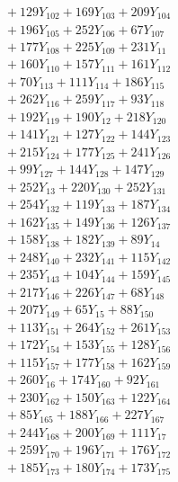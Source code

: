 \documentclass[a4paper,10pt]{article}
\begin{document}
{\begin{align}
&\quad  + 129Y_{102} + 169Y_{103} + 209Y_{104} \\[0.5ex]
&\quad  + 196Y_{105} + 252Y_{106} + 67Y_{107} \\[0.5ex]
&\quad  + 177Y_{108} + 225Y_{109} + 231Y_{11} \\[0.5ex]
&\quad  + 160Y_{110} + 157Y_{111} + 161Y_{112} \\[0.5ex]
&\quad  + 70Y_{113} + 111Y_{114} + 186Y_{115} \\[0.5ex]
&\quad  + 262Y_{116} + 259Y_{117} + 93Y_{118} \\[0.5ex]
&\quad  + 192Y_{119} + 190Y_{12} + 218Y_{120} \\[0.5ex]
&\quad  + 141Y_{121} + 127Y_{122} + 144Y_{123} \\[0.5ex]
&\quad  + 215Y_{124} + 177Y_{125} + 241Y_{126} \\[0.5ex]
&\quad  + 99Y_{127} + 144Y_{128} + 147Y_{129} \\[0.5ex]
&\quad  + 252Y_{13} + 220Y_{130} + 252Y_{131} \\[0.5ex]
&\quad  + 254Y_{132} + 119Y_{133} + 187Y_{134} \\[0.5ex]
&\quad  + 162Y_{135} + 149Y_{136} + 126Y_{137} \\[0.5ex]
&\quad  + 158Y_{138} + 182Y_{139} + 89Y_{14} \\[0.5ex]
&\quad  + 248Y_{140} + 232Y_{141} + 115Y_{142} \\[0.5ex]
&\quad  + 235Y_{143} + 104Y_{144} + 159Y_{145} \\[0.5ex]
&\quad  + 217Y_{146} + 226Y_{147} + 68Y_{148} \\[0.5ex]
&\quad  + 207Y_{149} + 65Y_{15} + 88Y_{150} \\[0.5ex]
&\quad  + 113Y_{151} + 264Y_{152} + 261Y_{153} \\[0.5ex]
&\quad  + 172Y_{154} + 153Y_{155} + 128Y_{156} \\[0.5ex]
&\quad  + 115Y_{157} + 177Y_{158} + 162Y_{159} \\[0.5ex]
&\quad  + 260Y_{16} + 174Y_{160} + 92Y_{161} \\[0.5ex]
&\quad  + 230Y_{162} + 150Y_{163} + 122Y_{164} \\[0.5ex]
&\quad  + 85Y_{165} + 188Y_{166} + 227Y_{167} \\[0.5ex]
&\quad  + 244Y_{168} + 200Y_{169} + 111Y_{17} \\[0.5ex]
&\quad  + 259Y_{170} + 196Y_{171} + 176Y_{172} \\[0.5ex]
&\quad  + 185Y_{173} + 180Y_{174} + 173Y_{175} \\[0.5ex]

\end{align}}
\end{document}
